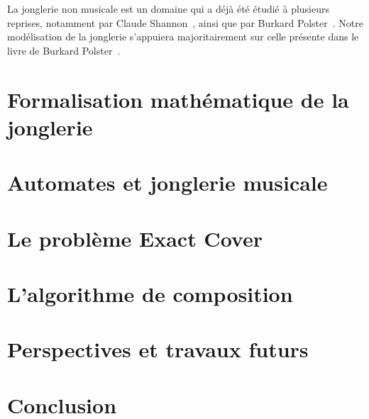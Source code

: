 \documentclass[a4paper]{easychair}
\begin{document}
La jonglerie non musicale est un domaine qui a déjà été étudié à plusieurs
reprises, notamment par Claude Shannon~\cite{shannon}, ainsi que par Burkard
Polster~\cite{polster}. Notre modélisation de la jonglerie s'appuiera
majoritairement sur celle présente dans le livre de Burkard
Polster~\cite{polster}.

\section{Formalisation mathématique de la jonglerie}

\section{Automates et jonglerie musicale}

\section{Le problème Exact Cover}

\section{L'algorithme de composition}

\section{Perspectives et travaux futurs}

\section{Conclusion}
\label{sec:conclusion}



\end{document}
